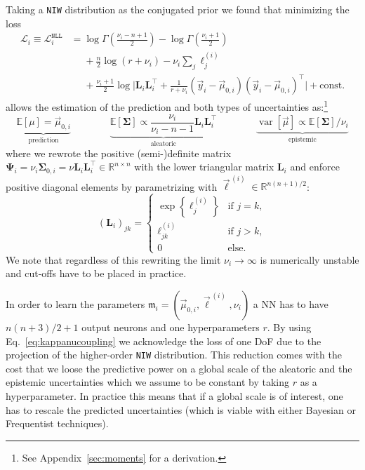 \documentclass{article}
\begin{document}
Taking a \texttt{NIW} distribution as the conjugated prior we found that minimizing the loss
\begin{align}
    \mathcal{L}_i \equiv \mathcal{L}^{\texttt{NLL}}_i
    &= \log \Gamma\!\left( \frac{\nu_i - n + 1}{2} \right) - \log \Gamma\!\left( \frac{\nu_i + 1}{2} \right) \nonumber \\
    &\phantom{=} + \frac{n}{2} \log(r + \nu_i) - \nu_i \sum\limits_j \ell_j^{(i)} \nonumber \\
    &\phantom{=} + \frac{\nu_i + 1}{2} \log \! \Big| \bm{L}_i \bm{L}_i^\top + \frac{1}{r + \nu_i} (\vec{y}_i - \vec{\mu}_{0,i}) (\vec{y}_i - \vec{\mu}_{0,i})^\top \Big| + \text{const.}
\end{align}
allows the estimation of the prediction and both types of uncertainties as:\footnote{See Appendix~\ref{sec:moments} for a derivation.}
\begin{equation}
    \underbrace{\mathbb{E}[\mu] = \vec{\mu}_{0,i}}_{\text{prediction}}
    \qquad\qquad
    \underbrace{\mathbb{E}[\bm{\Sigma}] \propto \frac{\nu_i}{\nu_i - n - 1} \bm{L}_i \bm{L}_i^\top}_{\text{aleatoric}}
    \qquad\qquad
    \underbrace{\operatorname{var}[\vec{\mu}] \propto \mathbb{E}[\bm{\Sigma}] / \nu_i}_{\text{epistemic}}
\end{equation}
where we rewrote the positive (semi-)definite matrix $\bm{\Psi}_i = \nu_i \bm{\Sigma}_{0,i} = \nu \bm{L}_i \bm{L}_i^\top \in \mathbb{R}^{n \times n}$ with the lower triangular matrix $\bm{L}_i$ and enforce positive diagonal elements by parametrizing with $\vec{\ell}^{\,(i)} \in \mathbb{R}^{n(n+1)/2}$:
\begin{equation}
    \left( \bm{L}_i \right)_{jk} =
    \begin{cases}
        \exp \! \left\{ \ell_j^{(i)} \right\} & \text{if } j=k, \\
        \ell_{jk}^{(i)} & \text{if } j>k, \\
        0 & \text{else.}
    \end{cases}
\end{equation}
We note that regardless of this rewriting the limit $\nu_i \to \infty$ is numerically unstable and cut-offs have to be placed in practice.

In order to learn the parameters $\mathfrak{m}_i = (\vec{\mu}_{0,i}, \vec{\ell}^{\,(i)}, \nu_i)$ a NN has to have $n(n + 3)/2 + 1$ output neurons and one hyperparameters $r$.
By using Eq.~\eqref{eq:kappanucoupling} we acknowledge the loss of one DoF due to the projection of the higher-order \texttt{NIW} distribution.
This reduction comes with the cost that we loose the predictive power on a global scale of the aleatoric and the epistemic uncertainties which we assume to be constant by taking $r$ as a hyperparameter.
In practice this means that if a global scale is of interest, one has to rescale the predicted uncertainties (which is viable with either Bayesian or Frequentist techniques).
\end{document}
